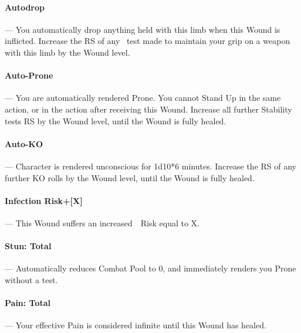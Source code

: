 \documentclass[oneside,11pt,english]{book}
\begin{document}
\vspace{-5pt}\paragraph{\label{par:Autodrop}Autodrop}---\quad 
You automatically drop anything held with this limb when this Wound is inflicted. Increase the RS of any ~test made to maintain your grip on a weapon with this limb by the Wound level. %

\vspace{-5pt}\paragraph{\label{par:Auto-Prone}Auto-Prone}---\quad
You are automatically rendered Prone. You cannot Stand Up in the same action, or in the action after receiving this Wound. Increase all further Stability tests RS by the Wound level, until the Wound is fully healed.

\vspace{-5pt}\paragraph{\label{par:Auto-KO}Auto-KO}---\quad
Character is rendered unconscious for 1d10*6 minutes. Increase the RS of any further KO rolls by the Wound level, until the Wound is fully healed.

\vspace{-5pt}\paragraph[Infection Risk]{\label{par:Infection Risk}Infection Risk+[X]}---\quad
This Wound suffers an increased~~Risk equal to X.

\vspace{-5pt}\paragraph[Total]{\label{par:Stun: Total}Stun: Total}---\quad
Automatically reduces Combat Pool to 0, and immediately renders you Prone without a test.

\vspace{-5pt}\paragraph[Total]{\label{par:Pain: Total}Pain: Total}---\quad
Your effective Pain is considered infinite until this Wound has healed.
\end{document}
